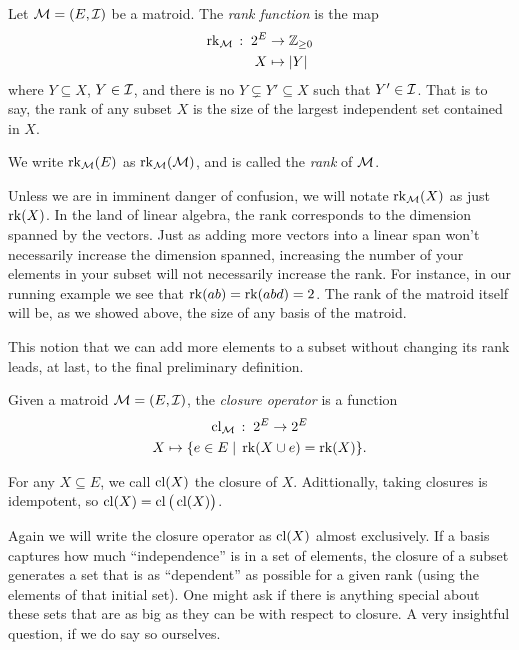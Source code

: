 \documentclass[12pt,oneside]{../../sfsuthesis}
\begin{document}
\begin{definition}[Rank]\th\label{def:rank}

    Let \( \mathcal{M} = (E, \mathcal{I}) \) be a matroid.
    The \emph{rank function} is the map
    \begin{align*}
        \operatorname{rk}_{\mathcal{M}} \, : \; 2^E & \to \mathbb{Z}_{\geq 0} \\
        X                   & \mapsto |Y|
    \end{align*}
    where \( Y \subseteq X \), \( Y \in \mathcal{I} \), and there is no \( Y \subsetneq Y' \subseteq X \) such that \( Y' \in \mathcal{I} \).
    That is to say, the rank of any subset \( X \) is the size of the largest independent set contained in \( X \).

    We write \( \operatorname{rk}_{\mathcal{M}}(E) \) as \( \operatorname{rk}_{\mathcal{M}}(\mathcal{M}) \), and is called the \emph{rank} of \( \mathcal{M} \).
\end{definition}
Unless we are in imminent danger of confusion, we will notate \( \operatorname{rk}_{\mathcal{M}}(X) \) as just \( \operatorname{rk}(X) \).
In the land of linear algebra, the rank corresponds to the dimension spanned by the vectors.
Just as adding more vectors into a linear span won't necessarily increase the dimension spanned, increasing the number of your elements in your subset will not necessarily increase the rank.
For instance, in our running example we see that \( \operatorname{rk}(ab) = \operatorname{rk}(abd) = 2 \).
The rank of the matroid itself will be, as we showed above, the size of any basis of the matroid.

This notion that we can add more elements to a subset without changing its rank leads, at last, to the final preliminary definition.

\begin{definition}[Closure]\th\label{def:closure}
    Given a matroid \( \mathcal{M} = (E, \mathcal{I}) \), the \emph{closure operator} is a function
    \begin{gather*}
        \operatorname{cl}_{\mathcal{M}} \, : \; 2^E \to 2^E \\
        X \mapsto \{ e \in E \; | \; \operatorname{rk}(X \cup e) = \operatorname{rk}(X) \}.
    \end{gather*}

    For any \( X \subseteq E \), we call \( \operatorname{cl}(X) \) the closure of \( X \).
    Adittionally, taking closures is idempotent, so \( \operatorname{cl}(X) = \operatorname{cl}\big(\operatorname{cl}(X)\big) \).

\end{definition}

Again we will write the closure operator as \( \operatorname{cl}(X) \) almost exclusively.
If a basis captures how much ``independence'' is in a set of elements, the closure of a subset generates a set that is as ``dependent'' as possible for a given rank (using the elements of that initial set).
One might ask if there is anything special about these sets that are as big as they can be with respect to closure.
A very insightful question, if we do say so ourselves.
\end{document}
